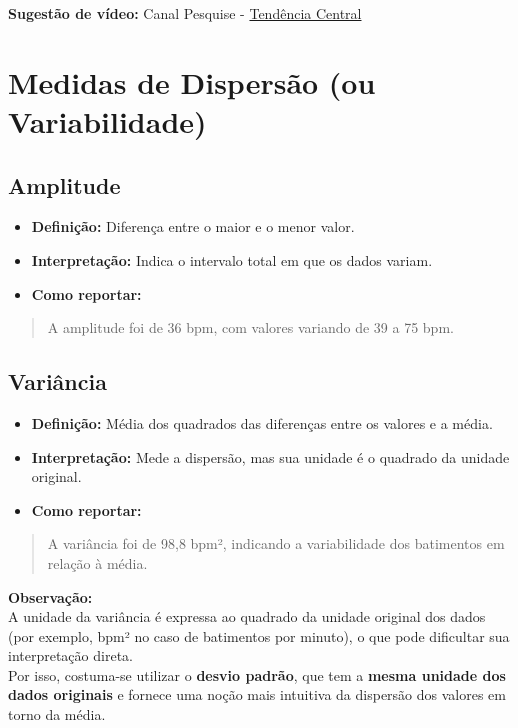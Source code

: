 \documentclass[
]{book}
\providecommand{\tightlist}{%
  \setlength{\itemsep}{0pt}\setlength{\parskip}{0pt}}
\begin{document}
\textbf{Sugestão de vídeo:} Canal Pesquise - \href{https://youtu.be/ot0aDB-grDY}{Tendência Central}

\section{Medidas de Dispersão (ou Variabilidade)}\label{medidas-de-dispersuxe3o-ou-variabilidade}

\subsection{Amplitude}\label{amplitude}

\begin{itemize}
\tightlist
\item
  \textbf{Definição:} Diferença entre o maior e o menor valor.\\
\item
  \textbf{Interpretação:} Indica o intervalo total em que os dados variam.\\
\item
  \textbf{Como reportar:}
\end{itemize}

\begin{quote}
A amplitude foi de 36 bpm, com valores variando de 39 a 75 bpm.
\end{quote}

\subsection{Variância}\label{variuxe2ncia}

\begin{itemize}
\tightlist
\item
  \textbf{Definição:} Média dos quadrados das diferenças entre os valores e a média.\\
\item
  \textbf{Interpretação:} Mede a dispersão, mas sua unidade é o quadrado da unidade original.\\
\item
  \textbf{Como reportar:}
\end{itemize}

\begin{quote}
A variância foi de 98,8 bpm², indicando a variabilidade dos batimentos em relação à média.
\end{quote}

\textbf{Observação:}\\
A unidade da variância é expressa ao quadrado da unidade original dos dados (por exemplo, bpm² no caso de batimentos por minuto), o que pode dificultar sua interpretação direta.\\
Por isso, costuma-se utilizar o \textbf{desvio padrão}, que tem a \textbf{mesma unidade dos dados originais} e fornece uma noção mais intuitiva da dispersão dos valores em torno da média.
\end{document}
